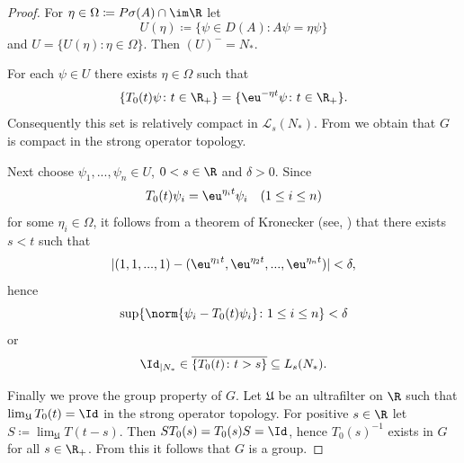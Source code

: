 \begin{proof}
For $\eta \in \Omega \coloneqq P\sigma(A) \cap \im\R$ let
\[
U(\eta) \coloneqq \{\psi \in D(A): A\psi = \eta\psi\}
\]
and $U = \{U(\eta) \colon \eta \in \Omega\}$.
Then $(U)^{-} = N_{*}$.

For each $\psi \in U$ there exists $\eta \in \Omega$ such that
\[
\{T_{0}(t)\psi \colon t \in \R_{+}\} = \{\eu^{-\eta t}\psi \colon t \in \R_{+}\} .
\]
Consequently this set is relatively compact in $\mathcal{L}_{s}(N_{*})$.
From \textcite[III.4.5]{schaefer:1966} we obtain that $G$ is compact in the strong operator topology.

Next choose $\psi_{1}, ..., \psi_{n} \in U$, $0 < s \in \R$ and $\delta > 0$.
Since 
\[
T_{0}(t)\psi_{i} = \eu^{\eta_{i}t}\psi_{i} 
\quad (1 \leq i \leq n)
\]
for some $\eta_{i} \in \Omega$, it follows from a theorem of Kronecker (see, \textcite[Satz 6.1., p.77]{jacobs:1972}) that there exists $s < t$ such that
\[
|(1,1, ..., 1) - (\eu^{\eta_{1}t}, \eu^{\eta_{2}t}, ..., \eu^{\eta_{n}t})| < \delta ,
\]
hence
\[
\sup\{\norm{\psi_{i} - T_{0}(t)\psi_{i}} \colon 1 \leq i \leq n\} < \delta
\]
or 
\[
\Id_{|N_{*}} \in \overline{\{T_{0}(t) \colon t>s\}} \subseteq L_{s}(N_{*}).
\]

Finally we prove the group property of\/ $G$.
Let $\mathfrak{U}$ be an ultrafilter on $\R$ such that $\lim_{\mathfrak{U}}T_{0}(t) = \Id$ in the strong operator topology.
For positive $s \in \R$ let $S \coloneqq \lim_{\mathfrak{U}}T(t-s)$.
Then $ST_{0}(s) = T_{0}(s)S = \Id$, hence $T_{0}(s)^{-1}$ exists in $G$ for all $s \in \R_{+}$.
From this it follows that $G$ is a group.
\end{proof}
